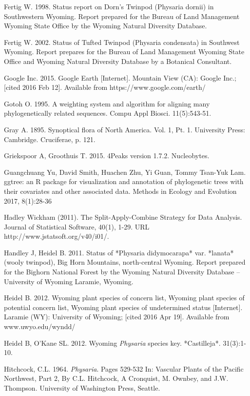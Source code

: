 Fertig W. 1998. Status report on Dorn’s Twinpod (Physaria dornii) in Southwestern Wyoming. Report prepared for the Bureau of Land Management Wyoming State Office by the Wyoming Natural Diversity Database.  

Fertig W. 2002. Status of Tufted Twinpod (Physaria condensata) in Southwest Wyoming. Report prepares for the Bureau of Land Management Wyoming State Office and Wyoming Natural Diversity Database by a Botanical Consultant.

Google Inc. 2015. Google Earth [Internet]. Mountain View (CA): Google Inc.; [cited 2016 Feb 12]. Available from https://www.google.com/earth/

Gotoh O. 1995. A weighting system and algorithm for aligning many phylogenetically related sequences. Compu Appl Biosci. 11(5):543-51.

Gray A. 1895. Synoptical flora of North America. Vol. 1, Pt. 1. University Press: Cambridge. Cruciferae, p. 121.

Griekspoor A, Groothuis T. 2015. 4Peaks version 1.7.2. Nucleobytes.

Guangchuang Yu, David Smith, Huachen Zhu, Yi Guan, Tommy Tsan-Yuk Lam. ggtree: an R package for visualization and annotation of phylogenetic trees with their covariates and other associated data. Methods in Ecology and Evolution 2017, 8(1):28-36
  
Hadley Wickham (2011). The Split-Apply-Combine Strategy for Data Analysis. Journal of Statistical Software, 40(1), 1-29. URL http://www.jstatsoft.org/v40/i01/.

Handley J, Heidel B. 2011. Status of *Physaria didymocarapa* var. *lanata* (wooly twinpod), Big Horn Mountains, north-central Wyoming. Report prepared for the Bighorn National Forest by the Wyoming Natural Diversity Database – University of Wyoming Laramie, Wyoming.  

Heidel B. 2012. Wyoming plant species of concern list, Wyoming plant species of potential concern list, Wyoming plant species of undetermined status  [Internet]. Laramie (WY): University of Wyoming; [cited 2016 Apr 19]. Available from www.uwyo.edu/wyndd/

Heidel B, O’Kane SL. 2012. Wyoming \textit{Physaria} species key. *Castilleja*. 31(3):1-10.

Hitchcock, C.L. 1964. \textit{Physaria}. Pages 529-532 In: Vascular Plants of the Pacific Northwest, Part 2, By C.L. Hitchcock, A Cronquist, M. Ownbey, and J.W. Thompson. University of Washington Press, Seattle.

